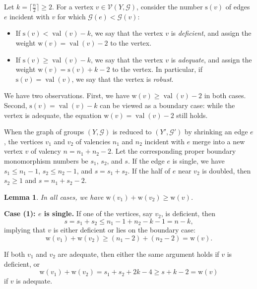 \documentclass[12pt,leqno]{amsart}
\makeatletter
\renewenvironment{proof}[1][\proofname]{%
	\par
	\pushQED{\qed}%
	\normalfont
	\topsep6\p@\@plus6\p@\relax
	\trivlist
	\item[\hskip\labelsep\itshape #1\@addpunct{.}]%
	\ignorespaces
}{%
	\par\nobreak\vspace{2pt}%
	\popQED%
	\medskip%
	\endtrivlist
	\@endpefalse
}
\newcommand{\2}{L^2_{\rm per}(0, T)}
\newtheorem{lem}{Lemma}[section]
\newcommand{\val}{{\operatorname{val}}}
\numberwithin{equation}{section}
\numberwithin{figure}{section}
\makeatother
\begin{document}
\begin{proof}
    Let $k = \lceil \frac{n}{2}\rceil\geq 2$. For a vertex $v\in\mathcal{V}(Y,\mathcal{G})$, consider the number $\mathrm{s}(v)$ of edges $e$ incident with $v$ for which $\mathcal{G}(e)< \mathcal{G}(v)$:
    \begin{itemize}
        \item If $\mathrm{s}(v)<\val(v)-k$, we say that the vertex $v$ is \emph{deficient}, and assign the weight $\mathrm{w}(v) = \val(v)-2$ to the vertex.
        \item If $\mathrm{s}(v)\geq \val(v)-k$, we say that the vertex $v$ is \emph{adequate}, and assign the weight $\mathrm{w}(v) = \mathrm{s}(v)+k-2$ to the vertex. In particular, if $\mathrm{s}(v) = \val(v)$, we say that the vertex is \emph{robust}.
    \end{itemize}
    We have two observations. First, we have $\mathrm{w}(v)\geq \val(v) - 2$ in both cases. Second, $\mathrm{s}(v) = \val(v)-k$ can be viewed as a boundary case: while the vertex is adequate, the equation $\mathrm{w}(v) = \val(v)-2$ still holds.
    
    When the graph of groups $(Y,\mathcal{G})$ is reduced to $(Y',\mathcal{G}')$ by shrinking an edge $e$, the vertices $v_1$ and $v_2$ of valencies $n_1$ and $n_2$ incident with $e$ merge into a new vertex $v$ of valency $n = n_1+n_2-2$. Let the corresponding proper boundary monomorphism numbers be $s_1$, $s_2$, and $s$. If the edge $e$ is single, we have $s_1\leq n_1-1$, $s_2\leq n_2 - 1$, and $s = s_1+s_2$. If the half of $e$ near $v_2$ is doubled, then $s_2\geq 1$ and $s =n_1+s_2-2$.
    \begin{lem}
        In all cases, we have $\mathrm{w}(v_1) + \mathrm{w}(v_2)\geq \mathrm{w}(v)$.
    \end{lem}
    \begin{proof}
        \textbf{Case (1): $e$ is single.} If one of the vertices, say $v_2$, is deficient, then
        \[
        s = s_1+s_2\leq n_1-1+n_2-k-1 = n-k,
        \]
        implying that $v$ is either deficient or lies on the boundary case:
        \[
        \mathrm{w}(v_1) + \mathrm{w}(v_2) \geq (n_1-2)+(n_2-2) = \mathrm{w}(v).
        \]
        
        If both $v_1$ and $v_2$ are adequate, then either the same argument holds if $v$ is deficient, or
        \[
        \mathrm{w}(v_1) + \mathrm{w}(v_2) = s_1+s_2+2k-4\geq s + k-2 = \mathrm{w}(v)
        \]
        if $v$ is adequate.


\end{proof}
\end{proof}
\end{document}
